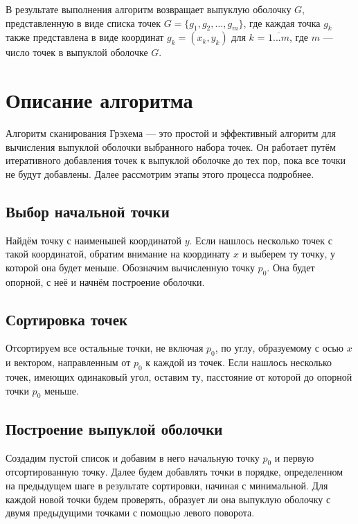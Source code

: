 \documentclass[a4paper,12pt]{article}
\begin{document}
В результате выполнения алгоритм возвращает выпуклую оболочку \( G \), представленную в виде списка точек \( G = \{ g_1, g_2, \ldots, g_m \} \), где каждая точка \( g_k \) также представлена в виде координат \( g_k = (x_k, y_k) \) для $k$ = $\overline{1...m}$, где \( m \) — число точек в выпуклой оболочке \( G \).

\section{Описание алгоритма}
\hspace*{15pt}Алгоритм сканирования Грэхема — это простой и эффективный алгоритм для вычисления выпуклой оболочки выбранного набора точек. Он работает путём итеративного добавления точек к выпуклой оболочке до тех пор, пока все точки не будут добавлены. Далее рассмотрим этапы этого процесса подробнее.


\subsection*{Выбор начальной точки}
\hspace*{15pt}Найдём точку с наименьшей координатой \(y\). Если нашлось несколько точек с такой координатой, обратим внимание на координату \(x\) и выберем ту точку, у которой она будет меньше. Обозначим вычисленную точку \( p_0 \). Она будет опорной, с неё и начнём построение оболочки.


\subsection*{Сортировка точек}
\hspace*{15pt}Отсортируем все остальные точки, не включая \( p_0 \), по углу, образуемому с осью \( x \) и вектором, направленным от \( p_0 \) к каждой из точек. Если нашлось несколько точек, имеющих одинаковый угол, оставим ту, пасстояние от которой до опорной точки  \( p_0 \) меньше.


\subsection*{Построение выпуклой оболочки}
\hspace*{15pt}Создадим пустой список и добавим в него начальную точку \( p_0 \) и первую отсортированную точку. Далее будем добавлять точки в порядке, определенном на предыдущем шаге в результате сортировки, начиная с минимальной. Для каждой новой точки будем проверять, образует ли она выпуклую оболочку с двумя предыдущими точками с помощью левого поворота.
\end{document}
